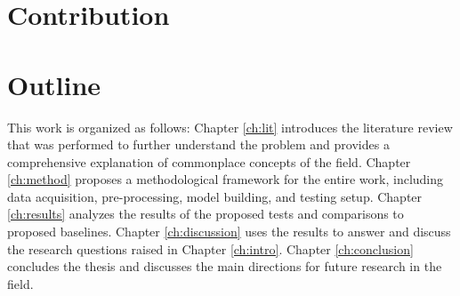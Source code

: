 \section{Contribution}




\section{Outline}

This work is organized as follows: Chapter \ref{ch:lit} introduces the literature review that was performed to further understand the problem and provides a comprehensive explanation of commonplace concepts of the field. Chapter \ref{ch:method} proposes a methodological framework for the entire work, including data acquisition, pre-processing, model building, and testing setup. Chapter \ref{ch:results} analyzes the results of the proposed tests and comparisons to proposed baselines. Chapter \ref{ch:discussion} uses the results to answer and discuss the research questions raised in Chapter \ref{ch:intro}. Chapter \ref{ch:conclusion} concludes the thesis and discusses the main directions for future research in the field.


